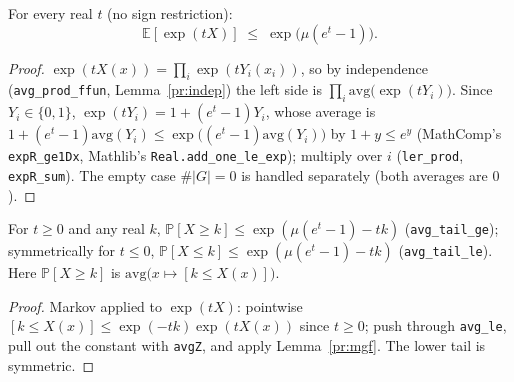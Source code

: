 \begin{lemma}\label{pr:mgf}
  \rocqok
  For every real $t$ (no sign restriction):
  \[
    \mathbb{E}[\exp(tX)] \;\le\; \exp\bigl(\mu(e^t-1)\bigr).
  \]
\end{lemma}
\begin{proof}
  \rocqok
  $\exp(tX(x)) = \prod_i \exp(tY_i(x_i))$, so by independence
  (\texttt{avg\_prod\_ffun}, Lemma~\ref{pr:indep}) the left side is
  $\prod_i \mathrm{avg}\bigl(\exp(tY_i)\bigr)$. Since $Y_i \in \{0,1\}$,
  $\exp(tY_i) = 1 + (e^t - 1)Y_i$, whose average is
  $1 + (e^t-1)\mathrm{avg}(Y_i) \le \exp\bigl((e^t-1)\mathrm{avg}(Y_i)\bigr)$
  by $1 + y \le e^y$ (MathComp's \texttt{expR\_ge1Dx}, Mathlib's
  \texttt{Real.add\_one\_le\_exp}); multiply over $i$
  (\texttt{ler\_prod}, \texttt{expR\_sum}). The empty case $\#|G| = 0$ is
  handled separately (both averages are $0$).
\end{proof}

\begin{lemma}\label{pr:chernoff}
  \rocqok
  For $t\ge0$ and any real $k$,
  $\mathbb{P}[X\ge k] \le \exp(\mu(e^t-1)-tk)$ (\texttt{avg\_tail\_ge});
  symmetrically for $t\le0$,
  $\mathbb{P}[X\le k] \le \exp(\mu(e^t-1)-tk)$ (\texttt{avg\_tail\_le}).
  Here $\mathbb{P}[X \ge k]$ is $\mathrm{avg}\bigl(x \mapsto [k \le X(x)]\bigr)$.
\end{lemma}
\begin{proof}
  \rocqok
  Markov applied to $\exp(tX)$: pointwise
  $[k \le X(x)] \le \exp(-tk)\exp(tX(x))$ since $t \ge 0$; push through
  \texttt{avg\_le}, pull out the constant with \texttt{avgZ}, and apply
  Lemma~\ref{pr:mgf}. The lower tail is symmetric.
\end{proof}


